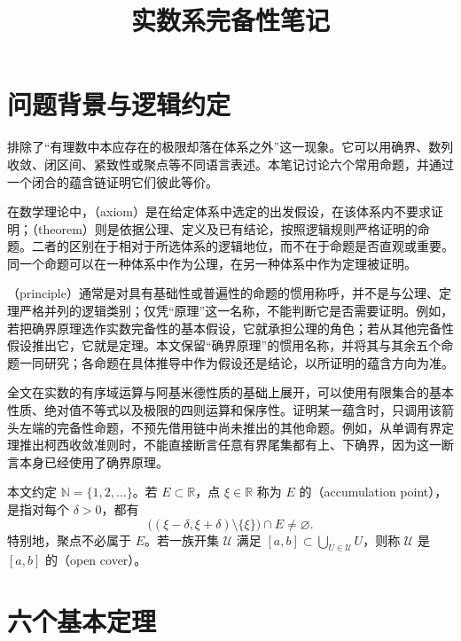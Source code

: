 \documentclass[UTF8,12pt,a4paper,fontset=fandol,oneside]{ctexart}
\title{实数系完备性笔记}
\author{}
\date{}
\begin{document}

\maketitle
\tableofcontents
\clearpage

\section{问题背景与逻辑约定}

排除了“有理数中本应存在的极限却落在体系之外”这一现象。它可以用确界、数列收敛、闭区间、紧致性或聚点等不同语言表述。本笔记讨论六个常用命题，并通过一个闭合的蕴含链证明它们彼此等价。

\begin{whispers}
在数学理论中，{\upshape{}}（axiom）是在给定体系中选定的出发假设，在该体系内不要求证明；{\upshape{}}（theorem）则是依据公理、定义及已有结论，按照逻辑规则严格证明的命题。二者的区别在于相对于所选体系的逻辑地位，而不在于命题是否直观或重要。同一个命题可以在一种体系中作为公理，在另一种体系中作为定理被证明。

{\upshape{}}（principle）通常是对具有基础性或普遍性的命题的惯用称呼，并不是与公理、定理严格并列的逻辑类别；仅凭“原理”这一名称，不能判断它是否需要证明。例如，若把确界原理选作实数完备性的基本假设，它就承担公理的角色；若从其他完备性假设推出它，它就是定理。本文保留“确界原理”的惯用名称，并将其与其余五个命题一同研究；各命题在具体推导中作为假设还是结论，以所证明的蕴含方向为准。
\end{whispers}

全文在实数的有序域运算与阿基米德性质的基础上展开，可以使用有限集合的基本性质、绝对值不等式以及极限的四则运算和保序性。证明某一蕴含时，只调用该箭头左端的完备性命题，不预先借用链中尚未推出的其他命题。例如，从单调有界定理推出柯西收敛准则时，不能直接断言任意有界尾集都有上、下确界，因为这一断言本身已经使用了确界原理。

本文约定 $\mathbb N=\{1,2,\ldots\}$。若 $E\subset\mathbb R$，点 $\xi\in\mathbb R$ 称为 $E$ 的（accumulation point），是指对每个 $\delta>0$，都有
\[
  \bigl((\xi-\delta,\xi+\delta)\setminus\{\xi\}\bigr)\cap E\ne\varnothing.
\]
特别地，聚点不必属于 $E$。若一族开集 $\mathcal U$ 满足 $[a,b]\subset\bigcup_{U\in\mathcal U}U$，则称 $\mathcal U$ 是 $[a,b]$ 的（open cover）。

\section{六个基本定理}
\end{document}
